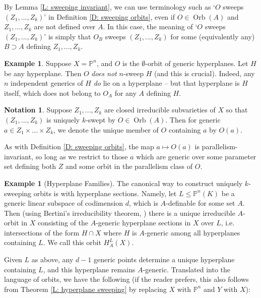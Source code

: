 \documentclass{amsart}
\theoremstyle{definition}
\newtheorem{example}[theorem]{Example}
\newtheorem{notation}[theorem]{Notation}
\begin{document}
By Lemma \ref{L: sweeping invariant}, we can use terminology such as `$O$ sweeps $(Z_1,...,Z_k)$' in Definition \ref{D: sweeping orbits}, even if $O\in\operatorname{Orb}(A)$ and $Z_1,...,Z_k$ are not defined over $A$. In this case, the meaning of `$O$ sweeps $(Z_1,...,Z_k)$' is simply that $O_B$ sweeps $(Z_1,...,Z_k)$ for some (equivalently any) $B\supset A$ defining $Z_1,...,Z_k$.

\begin{example}
    Suppose $X=\mathbb P^n$, and $O$ is the $\emptyset$-orbit of generic hyperplanes. Let $H$ be any hyperplane. Then $O$ \textit{does not} $n$-sweep $H$ (and this is crucial). Indeed, any $n$ independent generics of $H$ \textit{do} lie on a hyperplane -- but that hyperplane is $H$ itself, which does not belong to $O_A$ for any $A$ defining $H$. 
\end{example}

\begin{notation} Suppose $Z_1,...,Z_k$ are closed irreducible subvarieties of $X$ so that $(Z_1,...,Z_k)$ is uniquely $k$-swept by $O\in\operatorname{Orb}(A)$. Then for generic $a\in Z_1\times...\times Z_k$, we denote the unique member of $O$ containing $a$ by $O(a)$.
\end{notation}

As with Definition \ref{D: sweeping orbits}, the map $a\mapsto O(a)$ is parallelism-invariant, so long as we restrict to those $a$ which are generic over some parameter set defining both $Z$ and some orbit in the parallelism class of $O$.

\begin{example}[Hyperplane Families] The canonical way to construct uniquely $k$-sweeping orbits is with hyperplane sections. Namely, let $L\leq\mathbb P^n(K)$ be a generic linear subspace of codimension $d$, which is $A$-definable for some set $A$. Then (using Bertini's irreducibility theorem, \cite[Theorem 6.3(4)]{BertiniIrreducibility}) there is a unique irreducible $A$-orbit in $X$ consisting of the $A$-generic hyperplane sections in $X$ over $L$, i.e. intersections of the form $H\cap X$ where $H$ is $A$-generic among all hyperplanes containing $L$. We call this orbit $H^L_A(X)$.
\end{example}

Given $L$ as above, any $d-1$ generic points determine a unique hyperplane containing $L$, and this hyperplane remains $A$-generic. Translated into the language of orbits, we have the following (if the reader prefers, this also follows from Theorem \ref{L: hyperplane sweeping} by replacing $X$ with $\mathbb P^n$ and $Y$ with $X$):
\end{document}
